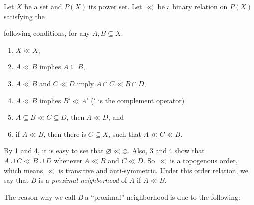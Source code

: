\documentclass[12pt]{article}
\begin{document}
Let $X$ be a set and $P(X)$ its power set.  Let $\ll$ be a binary relation on $P(X)$ satisfying the

following conditions, for any $A,B\subseteq X$:
\begin{enumerate}
\item $X\ll X$,
\item $A\ll B$ implies $A\subseteq B$,
\item $A\ll B$ and $C\ll D$ imply $A\cap C\ll B\cap D$,
\item $A\ll B$ implies $B'\ll A'$ ($'$ is the complement operator)
\item $A\subseteq B\ll C\subseteq D$, then $A\ll D$, and
\item if $A\ll B$, then there is $C\subseteq X$, such that $A\ll C\ll B$.
\end{enumerate}
By 1 and 4, it is easy to see that $\varnothing\ll \varnothing$.  Also, 3 and 4 show that $A\cup C\ll B\cup D$ whenever $A\ll B$ and $C\ll D$.  So $\ll$ is a topogenous order, which means $\ll$ is transitive and anti-symmetric.  Under this order relation, we say that $B$ is a \emph{proximal neighborhood} of $A$ if $A\ll B$.

The reason why we call $B$ a ``proximal'' neighborhood is due to the following:
\end{document}
